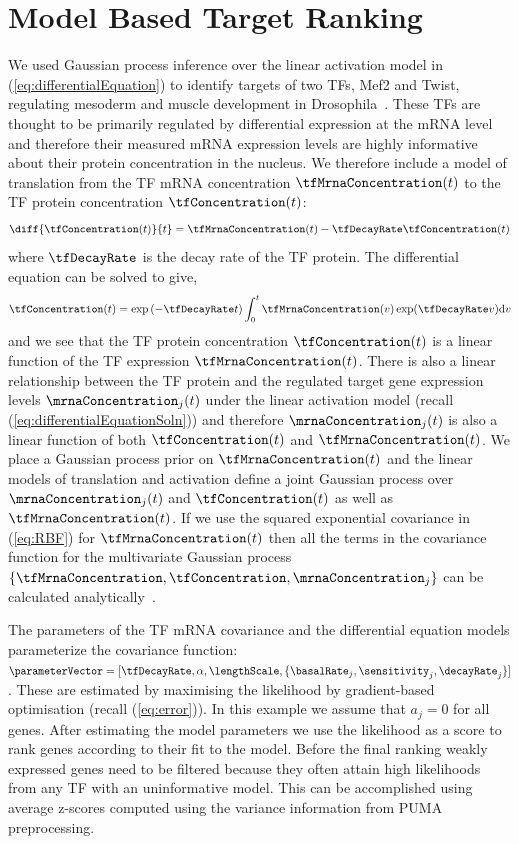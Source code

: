 \documentclass{article}
\begin{document}
\section{Model Based Target Ranking}
\label{sec:targetRanking}

We used Gaussian process inference over the linear activation model in
(\ref{eq:differentialEquation}) to identify targets of two TFs, Mef2
and Twist, regulating mesoderm and muscle development in
Drosophila~\citep{Honkela:modelbased10}. These TFs are thought to be
primarily regulated by differential expression at the mRNA level and
therefore their measured mRNA expression levels are highly informative
about their protein concentration in the nucleus. We therefore include
a model of translation from the TF mRNA concentration
$\tfMrnaConcentration(t)$ to the TF protein concentration
$\tfConcentration(t)$:
\begin{equation}
\diff{\tfConcentration(t)}{t} = \tfMrnaConcentration(t) - \tfDecayRate
\tfConcentration(t)
\end{equation}
where $\tfDecayRate$ is the decay rate of the TF protein. The
differential equation can be solved to give,
\[
\tfConcentration(t) = \exp\left(-\tfDecayRate t\right) \int_0^t
    \tfMrnaConcentration(v) \exp(\tfDecayRate v)  \mathrm{d}v
\]
and we see that the TF protein concentration $\tfConcentration(t)$ is
a linear function of the TF expression
$\tfMrnaConcentration(t)$. There is also a linear relationship between
the TF protein and the regulated target gene expression levels
$\mrnaConcentration_j(t)$ under the linear activation model (recall
(\ref{eq:differentialEquationSoln})) and therefore
$\mrnaConcentration_j(t)$ is also a linear function of both
$\tfConcentration(t)$ and $\tfMrnaConcentration(t)$. We place a
Gaussian process prior on $\tfMrnaConcentration(t)$ and the linear
models of translation and activation define a joint Gaussian process
over $\mrnaConcentration_j(t)$ and $\tfConcentration(t)$ as well as
$\tfMrnaConcentration(t)$. If we use the squared exponential
covariance in (\ref{eq:RBF}) for $\tfMrnaConcentration(t)$ then all
the terms in the covariance function for the multivariate Gaussian
process
$\{\tfMrnaConcentration,\tfConcentration,\mrnaConcentration_j\}$ can
be calculated analytically~\citep{Honkela:modelbased10}.

The parameters of the TF mRNA covariance and the differential equation
models parameterize the covariance function: $\parameterVector =
[\tfDecayRate,\alpha,\lengthScale,\{\basalRate_j, \sensitivity_j,
\decayRate_j\}]$. These are estimated by maximising the likelihood by
gradient-based optimisation (recall (\ref{eq:error})).  In this
example we assume that $a_j = 0$ for all genes. After estimating the
model parameters we use the likelihood as a score to rank genes
according to their fit to the model. Before the final ranking weakly
expressed genes need to be filtered because they often attain high
likelihoods from any TF with an uninformative model.  This can be
accomplished using average z-scores computed using the variance
information from PUMA preprocessing.
\end{document}
